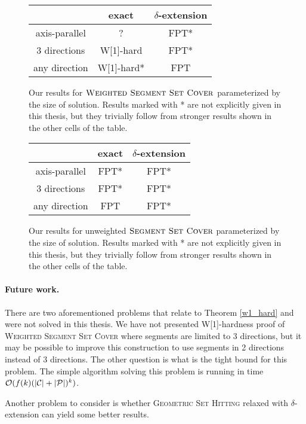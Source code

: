 \begin{figure}[h]
\begin{center}
\begin{tabular}{ | c | c | c | }
\hline
                & exact     & $\delta$-extension \\ 
\hline                
 axis-parallel   & ? & FPT* \\  
\hline                
 3 directions    & W[1]-hard & FPT* \\  
\hline                
 any direction   & W[1]-hard* & FPT \\
\hline                
\end{tabular}
\caption{Our results for $\textsc{Weighted Segment Set Cover}$
parameterized by the size of solution.
Results marked with * are not explicitly given in this thesis,
but they trivially follow from stronger results shown in the other cells of the table.}
\label{tab:weighted_fpt}
\end{center}
\end{figure}

\begin{figure}[h]
\begin{center}
\begin{tabular}{ | c | c | c | }
\hline
                & exact     & $\delta$-extension \\ 
\hline                
 axis-parallel   & FPT* & FPT* \\  
\hline                
 3 directions    & FPT* & FPT* \\  
\hline                
 any direction   & FPT  & FPT* \\
\hline                
\end{tabular}
\caption{Our results for unweighted $\textsc{Segment Set Cover}$
parameterized by the size of solution.
Results marked with * are not explicitly given in this thesis,
but they trivially follow from stronger results shown in the other cells of the table.}
\label{tab:unweighted_fpt}
\end{center}
\end{figure}

\paragraph{Future work.} There are two aforementioned problems
that relate to Theorem \ref{w1_hard} and were not solved in this thesis.
We have not presented W[1]-hardness proof
of \textsc{Weighted} \textsc{Segment} \textsc{Set} \textsc{Cover} where segments are limited to 3 directions,
but it may be possible to improve this construction to use segments
in 2 directions instead of 3 directions. 
The other question is what is the tight bound for this problem.
The simple algorithm solving
this problem is running in time ${\mathcal{O}(f(k)(|\mathcal{C}| + |\mathcal{P}|)^k)}$.

Another problem to consider is whether
\textsc{Geometric Set Hitting} relaxed with $\delta$-extension
can yield some better results.
